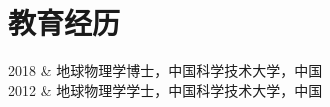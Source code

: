 \section{教育经历}

\begin{EntriesTable}{0.18}{0.02}{0.80}
2018 & 地球物理学博士，中国科学技术大学，中国 \\
2012 & 地球物理学学士，中国科学技术大学，中国
\end{EntriesTable}

